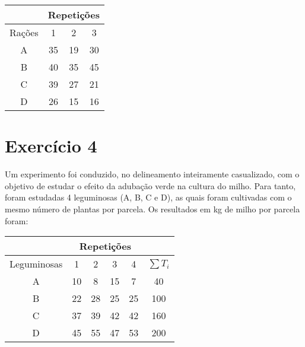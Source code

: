 \documentclass[a4paper,11pt,twoside,openright]{report}
\begin{document}
\begin{center}
\begin{tabular}{l|l|l|l}
\hline
\multicolumn{1}{c}{} & \multicolumn{3}{c}{Repeti\c{c}\~{o}es} \\ 
\hline
\multicolumn{1}{c|}{Ra\c{c}\~{o}es} & \multicolumn{1}{c|}{1} & \multicolumn{1}{c|}{2} & \multicolumn{1}{c}{3} \\ 
\hline
\multicolumn{1}{c|}{A} & \multicolumn{1}{c|}{35} & \multicolumn{1}{c|}{19} & \multicolumn{1}{c}{30} \\ 
\hline
\multicolumn{1}{c|}{B} & \multicolumn{1}{c|}{40} & \multicolumn{1}{c|}{35} & \multicolumn{1}{c}{45} \\ 
\hline
\multicolumn{1}{c|}{C} & \multicolumn{1}{c|}{39} & \multicolumn{1}{c|}{27} & \multicolumn{1}{c}{21} \\
\hline 
\multicolumn{1}{c|}{D} & \multicolumn{1}{c|}{26} & \multicolumn{1}{c|}{15} & \multicolumn{1}{c}{16} \\ 
\hline
\end{tabular}
\end{center}

\section*{Exerc\'icio 4}
\hspace{0.5cm}Um experimento foi conduzido, no delineamento inteiramente casualizado, com o objetivo de estudar o efeito da aduba\c{c}\~{a}o verde na
 cultura do milho.  Para tanto, foram estudadas 4 leguminosas (A, B, C e D), as quais foram cultivadas com o mesmo n\'{u}mero de plantas por parcela.  
Os resultados em kg de milho por parcela foram:

\begin{center}
\begin{tabular}{l|l|l|l|l|l}
\hline
\multicolumn{1}{c}{} & \multicolumn{4}{c}{Repeti\c{c}\~{o}es} & \multicolumn{1}{c}{} \\ 
\hline
\multicolumn{1}{c|}{Leguminosas} & \multicolumn{1}{c|}{1} & \multicolumn{1}{c|}{2} & \multicolumn{1}{c|}{3} & \multicolumn{1}{c|}{4} & \multicolumn{1}{c}{ $\sum T_{i}$} \\ 
\hline
\multicolumn{1}{c|}{A} & \multicolumn{1}{c|}{10} & \multicolumn{1}{c|}{8} & \multicolumn{1}{c|}{15} & \multicolumn{1}{c|}{7} & \multicolumn{1}{c}{40} \\ 
\hline
\multicolumn{1}{c|}{B} & \multicolumn{1}{c|}{22} & \multicolumn{1}{c|}{28} & \multicolumn{1}{c|}{25} & \multicolumn{1}{c|}{25} & \multicolumn{1}{c}{100} \\ 
\hline
\multicolumn{1}{c|}{C} & \multicolumn{1}{c|}{37} & \multicolumn{1}{c|}{39} & \multicolumn{1}{c|}{42} & \multicolumn{1}{c|}{42} & \multicolumn{1}{c}{160} \\ 
\hline
\multicolumn{1}{c|}{D} & \multicolumn{1}{c|}{45} & \multicolumn{1}{c|}{55} & \multicolumn{1}{c|}{47} & \multicolumn{1}{c|}{53} & \multicolumn{1}{c}{200} \\ 
\hline
\end{tabular}
\end{center}
\end{document}
